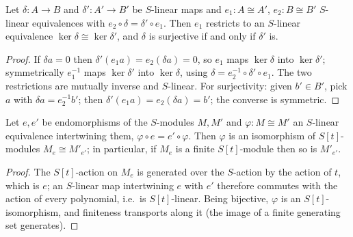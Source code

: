 \begin{lemma}
  \label{pa-lem:kerCongr}
  \leanok

  Let \(\delta : A \to B\) and \(\delta' : A' \to B'\) be \(S\)-linear maps and
  \(e_1 : A \cong A'\), \(e_2 : B \cong B'\) \(S\)-linear equivalences with
  \(e_2 \circ \delta = \delta' \circ e_1\). Then \(e_1\) restricts to an \(S\)-linear
  equivalence \(\ker \delta \cong \ker \delta'\), and \(\delta\) is surjective if and
  only if \(\delta'\) is.
\end{lemma}
\begin{proof}
  \leanok
  If \(\delta a = 0\) then \(\delta'(e_1 a) = e_2(\delta a) = 0\), so \(e_1\) maps
  \(\ker\delta\) into \(\ker\delta'\); symmetrically \(e_1^{-1}\) maps
  \(\ker\delta'\) into \(\ker\delta\), using \(\delta = e_2^{-1} \circ \delta' \circ
  e_1\). The two restrictions are mutually inverse and \(S\)-linear. For surjectivity:
  given \(b' \in B'\), pick \(a\) with \(\delta a = e_2^{-1} b'\); then
  \(\delta'(e_1 a) = e_2(\delta a) = b'\); the converse is symmetric.
\end{proof}

\begin{lemma}
  \label{pa-lem:aevalCongr}
  \leanok

  Let \(e, e'\) be endomorphisms of the \(S\)-modules \(M, M'\) and
  \(\varphi : M \cong M'\) an \(S\)-linear equivalence intertwining them,
  \(\varphi \circ e = e' \circ \varphi\). Then \(\varphi\) is an isomorphism of
  \(S[t]\)-modules \(M_e \cong M'_{e'}\); in particular, if \(M_e\) is a finite
  \(S[t]\)-module then so is \(M'_{e'}\).
\end{lemma}
\begin{proof}
  \leanok
  The \(S[t]\)-action on \(M_e\) is generated over the \(S\)-action by the action of
  \(t\), which is \(e\); an \(S\)-linear map intertwining \(e\) with \(e'\) therefore
  commutes with the action of every polynomial, i.e.\ is \(S[t]\)-linear. Being
  bijective, \(\varphi\) is an \(S[t]\)-isomorphism, and finiteness transports along it
  (the image of a finite generating set generates).
\end{proof}


